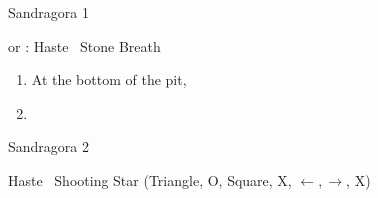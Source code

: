 \begin{battle}{Sandragora 1}
  \begin{itemize}
    \switch{\tidus}{\kimahri} or \tidus: Haste \kimahri
    \kimahrif \od\ Stone Breath
  \end{itemize}
\end{battle}
\begin{enumerate}[resume]
\item At the bottom of the pit, 
\item \formation{\tidus}{\lulu}{\auron}
\end{enumerate}
\begin{battle}{Sandragora 2}
  \begin{itemize}
    \tidusf Haste \auron
    \auronf \od\ Shooting Star (Triangle, O, Square, X, $\leftarrow, \rightarrow$, X)
  \end{itemize}
\end{battle}